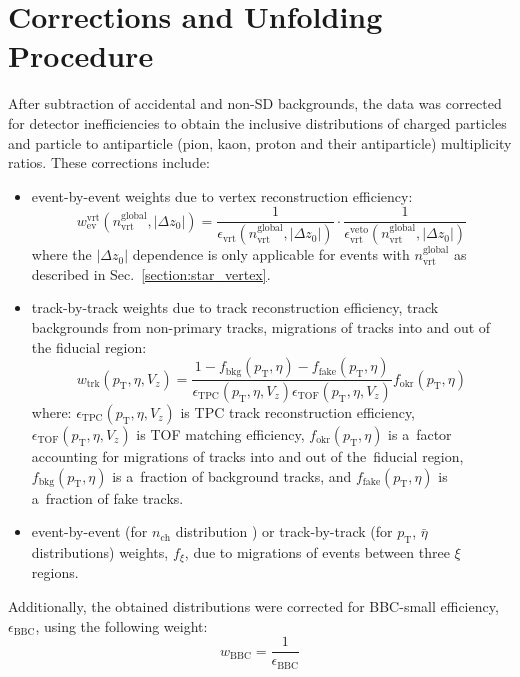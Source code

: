\chapter{Corrections and Unfolding Procedure}\label{section:star_corrections}
After subtraction of accidental and non-SD backgrounds, the data was corrected for detector inefficiencies to obtain the inclusive distributions of charged particles and particle to antiparticle (pion, kaon, proton and their antiparticle) multiplicity ratios. These corrections include:
\begin{itemize}
	\item event-by-event weights due to vertex reconstruction efficiency:
\begin{equation}
w_\textrm{ev}^\textrm{vrt}\left(n_\textrm{vrt}^\textrm{global}, |\Delta z_0|\right)=\frac{1}{\epsilon_\textrm{vrt}\left(n_\textrm{vrt}^\textrm{global}, |\Delta z_0|\right)}\cdot\frac{1}{\epsilon_\textrm{vrt}^\textrm{veto}\left(n_\textrm{vrt}^\textrm{global}, |\Delta z_0|\right)}
\label{eq:vertexCorrection}
\end{equation}
where the 	$|\Delta z_0|$ dependence is only applicable for events with $n_\textrm{vrt}^\textrm{global}$ as described in Sec.~\ref{section:star_vertex}.
	\item track-by-track weights due to track reconstruction efficiency, track backgrounds from non-primary tracks, migrations of tracks into and out of the fiducial region:
\begin{equation}
w_\textrm{trk}\left(p_\textrm{T},\eta,V_{z}\right)=\frac{1-f_\textrm{bkg}\left(p_\textrm{T},\eta\right)-f_\textrm{fake}\left(p_\textrm{T},\eta\right)}{\epsilon_\textrm{TPC}\left(p_\textrm{T},\eta,V_{z}\right)\epsilon_\textrm{TOF}\left(p_\textrm{T},\eta,V_{z}\right)}f_\textrm{okr}\left(p_\textrm{T},\eta\right)
\label{eq:trackCorrection}
\end{equation}
where: $\epsilon_\textrm{TPC}\left(p_\textrm{T},\eta,V_{z}\right)$ is TPC track reconstruction efficiency, $\epsilon_\textrm{TOF}\left(p_\textrm{T},\eta,V_{z}\right)$ is TOF matching efficiency, $f_\textrm{okr}\left(p_\textrm{T},\eta\right)$ is a~factor accounting for migrations of tracks into and out of the~fiducial region, $f_\textrm{bkg}\left(p_\textrm{T},\eta\right)$ is a~fraction of background tracks, and $f_\textrm{fake}\left(p_\textrm{T},\eta\right)$ is a~fraction of fake tracks.
\item event-by-event (for $n_\textrm{ch}$ distribution ) or track-by-track (for $p_\textrm{T}$, $\bar{\eta}$ distributions) weights, $f_{\xi}$, due to migrations of events between three $\xi$ regions.
\end{itemize}
Additionally, the obtained distributions were corrected for BBC-small efficiency, $\epsilon_\textrm{BBC}$, using the following weight:
\begin{equation}
w_\textrm{BBC} = \frac{1}{\epsilon_\textrm{BBC}}
\label{eq:bbcCorrection}
\end{equation} 

